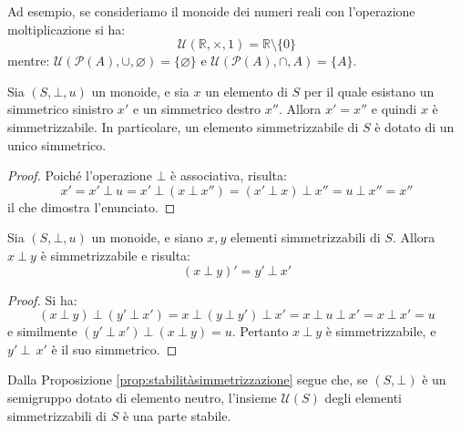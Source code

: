 \begin{example}
	Ad esempio, se consideriamo il monoide dei numeri reali con l'operazione moltiplicazione si ha:
	\begin{displaymath}
		\mathcal{U}(\mathbb{R}, \times  , 1) = \mathbb{R} \setminus \{0\}
	\end{displaymath}
	mentre:	$\mathcal{U}(\mathcal{P}(A), \cup , \varnothing) = \{ \varnothing \}$ e $\mathcal{U}(\mathcal{P}(A), \cap, A) = \{A\}$.
\end{example}


\begin{propbox}
	Sia $(S,\bot,u)$ un monoide, e sia $x$ un elemento di $S$ per il quale esistano un simmetrico sinistro $x'$ e un simmetrico destro $x''$. Allora $x'=x''$ e quindi $x$ è simmetrizzabile. In particolare, un elemento simmetrizzabile di $S$ è dotato di un unico simmetrico.
\end{propbox}

\begin{proof}\label{key}
	Poiché l'operazione $\bot$ è associativa, risulta:
	\begin{displaymath}
		x'= x' \ \bot \ u = x' \ \bot \ (x \ \bot \ x'') = ( x' \ \bot \ x ) \ \bot \ x'' = u \ \bot \ x'' = x''
	\end{displaymath}
	il che dimostra l'enunciato.
\end{proof}


\begin{propbox}\label{prop:stabilitàsimmetrizzazione}
	Sia $(S,\bot,u)$ un monoide, e siano $x,y$ elementi simmetrizzabili di $S$. Allora $x \ \bot \ y$ è simmetrizzabile e risulta:
	\begin{equation}
		(x \ \bot \ y)' = y' \ \bot \ x'
	\end{equation}
\end{propbox}


\begin{proof}
	Si ha:
	\begin{displaymath}
		( x \ \bot \ y) \ \bot \ (y' \ \bot \ x') = x \ \bot \ (y \ \bot \ y') \ \bot \ x' = x \ \bot \ u \ \bot \ x' = x \ \bot \ x' = u
	\end{displaymath}
	e similmente $(y' \ \bot \ x') \ \bot \ (x \ \bot \ y ) = u$. Pertanto $x \ \bot \ y$ è simmetrizzabile, e $y' \ \bot \ \ x'$ è il suo simmetrico.
\end{proof}

\begin{osservation}
	Dalla Proposizione \ref{prop:stabilitàsimmetrizzazione} segue che, se $(S, \bot)$ è un semigruppo dotato di elemento neutro, l'insieme $\mathcal{U}(S)$ degli elementi simmetrizzabili di $S$ è una parte stabile.
\end{osservation}

